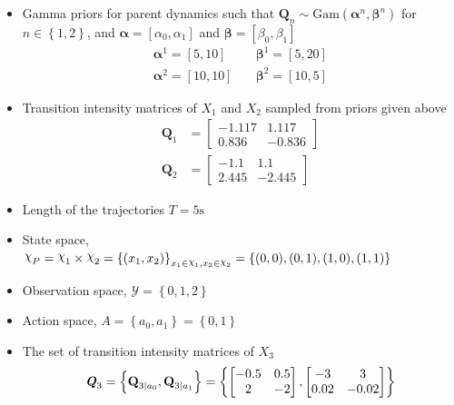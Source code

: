 \begin{itemize}
	\item Gamma priors for parent dynamics such that $ \textbf{Q}_{n} \sim \mathrm{Gam}(\symbf{\alpha}^n, \symbf{\beta}^n)$ for $n \in \left\lbrace 1,2\right\rbrace $, and $ \symbf{\alpha} = [\alpha_0, \alpha_1] $ and $ \symbf{\beta} = [\beta_0, \beta_1] $
	\begin{align}
	\symbf{\alpha}^1 = [5,10] &\quad \symbf{\beta}^1 = [5,20] \\
	\symbf{\alpha}^2 = [10,10] &\quad \symbf{\beta}^2 = [10,5]
	\label{eq:gamma_params}
	\end{align}
	\item Transition intensity matrices of $ X_1 $ and $ X_2 $ sampled from priors given above
	\begin{align}
	\textbf{Q}_1 &= 
	\begin{bmatrix}
	-1.117 & 1.117 \\
	0.836 &  -0.836
	\end{bmatrix} \\
	\textbf{Q}_2 &= 
	\begin{bmatrix}
	-1.1 & 1.1 \\
	2.445 &  -2.445
	\end{bmatrix}
	\end{align}
	\item Length of the trajectories $ T = 5\text{s} $
	\item State space, $ \rchi_{P} = \rchi_1 \times \rchi_2 = \left\lbrace (x_1, x_2)\right\rbrace_{x_1\in \rchi_1, x_2\in \rchi_2} = \left\lbrace (0, 0), (0, 1), (1, 0),(1, 1)\right\rbrace $
	\item Observation space, $ \mathcal{Y} = \left\lbrace 0, 1, 2 \right\rbrace $
	\item Action space, $ \textit{A} = \left\lbrace a_{0}, a_{1} \right\rbrace = \left\lbrace 0, 1\right\rbrace $
	\item The set of transition intensity matrices of $ X_3 $
	\begin{align}
	\textbf{\textit{Q}}_3 = \left\lbrace \textbf{Q}_{3\mid a_{0}}, \textbf{Q}_{3\mid a_{1}} \right\rbrace = \left\lbrace 
	\begin{bmatrix}
	-0.5 & 0.5 \\
	2 &  -2
	\end{bmatrix}, 
	\begin{bmatrix}
	-3 & 3 \\
	0.02 &  -0.02
	\end{bmatrix} 
	\right\rbrace 
	\end{align}

\end{itemize}
